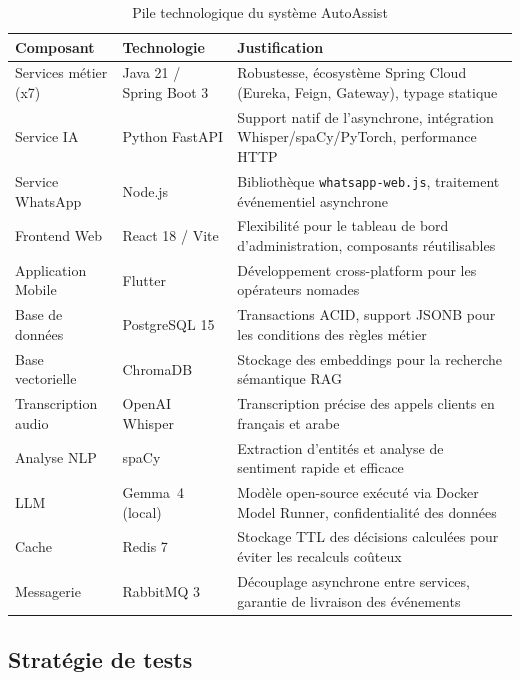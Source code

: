 \begin{table}[H]
\centering
\caption{Pile technologique du syst\`{e}me AutoAssist}
\label{tab:techstack}
\small
\begin{tabular}{|p{2.5cm}|p{3cm}|p{7cm}|}
\hline
\textbf{Composant} & \textbf{Technologie} & \textbf{Justification} \\
\hline
Services m\'{e}tier (x7) & Java 21 / Spring Boot 3 & Robustesse, \'{e}cosyst\`{e}me Spring Cloud (Eureka, Feign, Gateway), typage statique \\
\hline
Service IA & Python FastAPI & Support natif de l'asynchrone, int\'{e}gration Whisper/spaCy/PyTorch, performance HTTP \\
\hline
Service WhatsApp & Node.js & Biblioth\`{e}que \texttt{whatsapp-web.js}, traitement \'{e}v\'{e}nementiel asynchrone \\
\hline
Frontend Web & React 18 / Vite & Flexibilit\'{e} pour le tableau de bord d'administration, composants r\'{e}utilisables \\
\hline
Application Mobile & Flutter & D\'{e}veloppement cross-platform pour les op\'{e}rateurs nomades \\
\hline
Base de donn\'{e}es & PostgreSQL 15 & Transactions ACID, support JSONB pour les conditions des r\`{e}gles m\'{e}tier \\
\hline
Base vectorielle & ChromaDB & Stockage des embeddings pour la recherche s\'{e}mantique RAG \\
\hline
Transcription audio & OpenAI Whisper & Transcription pr\'{e}cise des appels clients en fran\c{c}ais et arabe \\
\hline
Analyse NLP & spaCy & Extraction d'entit\'{e}s et analyse de sentiment rapide et efficace \\
\hline
LLM & Gemma~4 (local) & Mod\`{e}le open-source ex\'{e}cut\'{e} via Docker Model Runner, confidentialit\'{e} des donn\'{e}es \\
\hline
Cache & Redis 7 & Stockage TTL des d\'{e}cisions calcul\'{e}es pour \'{e}viter les recalculs co\^{u}teux \\
\hline
Messagerie & RabbitMQ 3 & D\'{e}couplage asynchrone entre services, garantie de livraison des \'{e}v\'{e}nements \\
\hline
\end{tabular}
\end{table}

\subsection{Strat\'{e}gie de tests}

